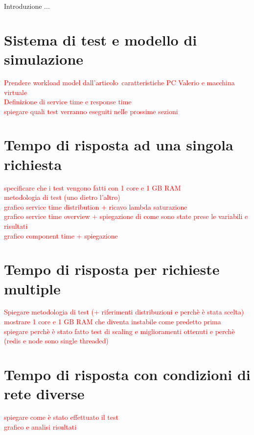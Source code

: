 
Introduzione ...

\section{Sistema di test e modello di simulazione}

\textcolor{red}{Prendere workload model dall'articolo\
	caratteristiche PC Valerio e macchina virtuale\\
	Definizione di service time e response time\\
	spiegare quali test verranno eseguiti nelle prossime sezioni}

\section{Tempo di risposta ad una singola richiesta}

\textcolor{red}{specificare che i test vengono fatti con 1 core e 1 GB RAM\\
	metodologia di test (uno dietro l'altro)\\
	grafico service time distribution + ricavo lambda saturazione\\
	grafico service time overview + spiegazione di come sono state prese le variabili e risultati\\
	grafico component time + spiegazione}

\section{Tempo di risposta per richieste multiple}

\textcolor{red}{Spiegare metodologia di test (+ riferimenti distribuzioni e perchè è stata scelta)\\
	mostrare 1 core e 1 GB RAM che diventa instabile come predetto prima\\
	spiegare perchè è stato fatto test di scaling e miglioramenti ottenuti e perchè (redis e node sono single threaded)}

\section{Tempo di risposta con condizioni di rete diverse}

\textcolor{red}{spiegare come è stato effettuato il test\\
	grafico e analisi risultati}